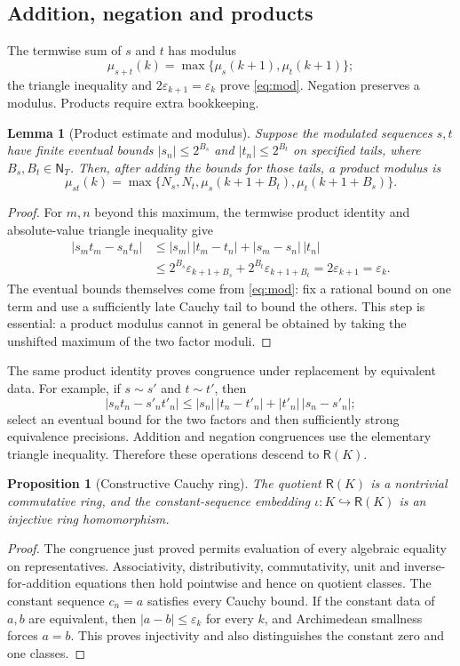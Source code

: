 \documentclass[11pt,reqno]{amsart}
\newtheorem{proposition}[theorem]{Proposition}
\newtheorem{lemma}[theorem]{Lemma}
\theoremstyle{definition}\newtheorem{definition}[theorem]{Definition}
\theoremstyle{remark}\newtheorem{remark}[theorem]{Remark}
\newcommand{\N}{\mathsf N_T}\newcommand{\Z}{\mathsf Z_T}\newcommand{\Q}{\mathsf Q_T}\newcommand{\RR}{\mathsf R}
\newcommand{\eps}{\varepsilon}
\begin{document}
\subsection{Addition, negation and products}\label{main:sub-42}
The termwise sum of $s$ and $t$ has modulus
\[
\mu_{s+t}(k)=\max\{\mu_s(k+1),\mu_t(k+1)\};
\]
the triangle inequality and $2\eps_{k+1}=\eps_k$ prove \eqref{eq:mod}. Negation preserves a modulus. Products require extra bookkeeping.

\begin{lemma}[Product estimate and modulus]\label{lem:product}
Suppose the modulated sequences $s,t$ have finite eventual bounds $|s_n|\le 2^{B_s}$ and $|t_n|\le2^{B_t}$ on specified tails, where $B_s,B_t\in\N$. Then, after adding the bounds for those tails, a product modulus is
\[
\mu_{st}(k)=\max\bigl\{N_s,N_t,
\mu_s(k+1+B_t),\mu_t(k+1+B_s)\bigr\}.
\]
\end{lemma}
\begin{proof}
For $m,n$ beyond this maximum, the termwise product identity and absolute-value triangle inequality give
\begin{align*}
|s_mt_m-s_nt_n|
&\le |s_m|\,|t_m-t_n|+|s_m-s_n|\,|t_n|\\
&\le 2^{B_s}\eps_{k+1+B_s}+2^{B_t}\eps_{k+1+B_t}
=2\eps_{k+1}=\eps_k.
\end{align*}
The eventual bounds themselves come from \eqref{eq:mod}: fix a rational bound on one term and use a sufficiently late Cauchy tail to bound the others. This step is essential: a product modulus cannot in general be obtained by taking the unshifted maximum of the two factor moduli.
\end{proof}

The same product identity proves congruence under replacement by equivalent data. For example, if $s\sim s'$ and $t\sim t'$, then
\[
|s_nt_n-s'_nt'_n|
\le |s_n|\,|t_n-t'_n|+|t'_n|\,|s_n-s'_n|;
\]
select an eventual bound for the two factors and then sufficiently strong equivalence precisions. Addition and negation congruences use the elementary triangle inequality. Therefore these operations descend to $\RR(K)$.

\begin{proposition}[Constructive Cauchy ring]\label{prop:realring}
The quotient $\RR(K)$ is a nontrivial commutative ring, and the constant-sequence embedding $\iota:K\hookrightarrow\RR(K)$ is an injective ring homomorphism.
\end{proposition}
\begin{proof}
The congruence just proved permits evaluation of every algebraic equality on representatives. Associativity, distributivity, commutativity, unit and inverse-for-addition equations then hold pointwise and hence on quotient classes. The constant sequence $c_n=a$ satisfies every Cauchy bound. If the constant data of $a,b$ are equivalent, then $|a-b|\le\eps_k$ for every $k$, and Archimedean smallness forces $a=b$. This proves injectivity and also distinguishes the constant zero and one classes.
\end{proof}
\end{document}
